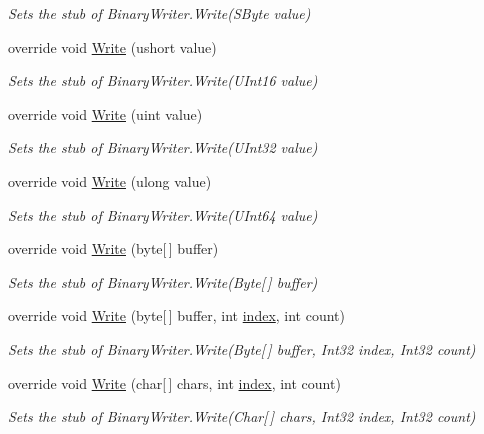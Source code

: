 \begin{DoxyCompactItemize}
\begin{DoxyCompactList}\small\item\em Sets the stub of Binary\-Writer.\-Write(\-S\-Byte value)\end{DoxyCompactList}\item 
override void \hyperlink{class_system_1_1_i_o_1_1_fakes_1_1_stub_binary_writer_ad1527a1c109786e04e1b25952b767e82}{Write} (ushort value)
\begin{DoxyCompactList}\small\item\em Sets the stub of Binary\-Writer.\-Write(\-U\-Int16 value)\end{DoxyCompactList}\item 
override void \hyperlink{class_system_1_1_i_o_1_1_fakes_1_1_stub_binary_writer_aee761a87f0a66224e72c2133f7237ad5}{Write} (uint value)
\begin{DoxyCompactList}\small\item\em Sets the stub of Binary\-Writer.\-Write(\-U\-Int32 value)\end{DoxyCompactList}\item 
override void \hyperlink{class_system_1_1_i_o_1_1_fakes_1_1_stub_binary_writer_ac122ab90e7f0e8dc2341557fb7a8ef86}{Write} (ulong value)
\begin{DoxyCompactList}\small\item\em Sets the stub of Binary\-Writer.\-Write(\-U\-Int64 value)\end{DoxyCompactList}\item 
override void \hyperlink{class_system_1_1_i_o_1_1_fakes_1_1_stub_binary_writer_adf190a0510a39aa66ada613dae41d57e}{Write} (byte\mbox{[}$\,$\mbox{]} buffer)
\begin{DoxyCompactList}\small\item\em Sets the stub of Binary\-Writer.\-Write(\-Byte\mbox{[}$\,$\mbox{]} buffer)\end{DoxyCompactList}\item 
override void \hyperlink{class_system_1_1_i_o_1_1_fakes_1_1_stub_binary_writer_a186688b1ea9937b515f8fd309433d0db}{Write} (byte\mbox{[}$\,$\mbox{]} buffer, int \hyperlink{jquery-1_810_82-vsdoc_8js_a75bb12d1f23302a9eea93a6d89d0193e}{index}, int count)
\begin{DoxyCompactList}\small\item\em Sets the stub of Binary\-Writer.\-Write(\-Byte\mbox{[}$\,$\mbox{]} buffer, Int32 index, Int32 count)\end{DoxyCompactList}\item 
override void \hyperlink{class_system_1_1_i_o_1_1_fakes_1_1_stub_binary_writer_a7e36214bc7a13409ea1e32f6c78fbe2f}{Write} (char\mbox{[}$\,$\mbox{]} chars, int \hyperlink{jquery-1_810_82-vsdoc_8js_a75bb12d1f23302a9eea93a6d89d0193e}{index}, int count)
\begin{DoxyCompactList}\small\item\em Sets the stub of Binary\-Writer.\-Write(\-Char\mbox{[}$\,$\mbox{]} chars, Int32 index, Int32 count)\end{DoxyCompactList}\end{DoxyCompactItemize}
